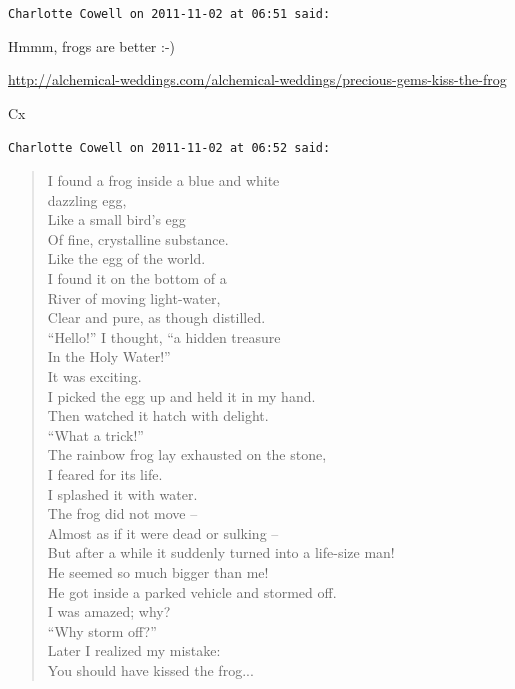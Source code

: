 \begin{footnotesize}
\begin{sffamily}
\texttt{Charlotte Cowell on 2011-11-02 at 06:51 said:}

Hmmm, frogs are better :-)

\url{http://alchemical-weddings.com/alchemical-weddings/precious-gems-kiss-the-frog}


Cx

\hfill

\texttt{Charlotte Cowell on 2011-11-02 at 06:52 said:}

\begin{verse}
I found a frog inside a blue and white\\
dazzling egg,\\
Like a small bird's egg\\
Of fine, crystalline substance.\\
Like the egg of the world.\\
I found it on the bottom of a\\
River of moving light-water,\\
Clear and pure, as though distilled.\\
``Hello!'' I thought, ``a hidden treasure\\
In the Holy Water!''\\
It was exciting.\\
I picked the egg up and held it in my hand.\\
Then watched it hatch with delight.\\
``What a trick!''\\
The rainbow frog lay exhausted on the stone,\\
I feared for its life.\\
I splashed it with water.\\
The frog did not move --\\
Almost as if it were dead or sulking --\\
But after a while it suddenly turned into a life-size man!\\
He seemed so much bigger than me!\\
He got inside a parked vehicle and stormed off.\\
I was amazed; why?\\
``Why storm off?''\\
Later I realized my mistake:\\
You should have kissed the frog... 
\end{verse}

\hfill

\end{sffamily}
\end{footnotesize}

